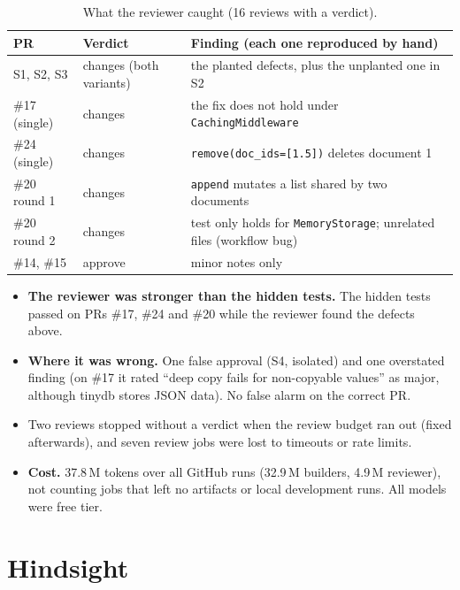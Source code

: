 \documentclass[11pt,a4paper]{article}
\newcommand{\code}[1]{\texttt{#1}}
\begin{document}
\begin{table}[H]
\centering\small
\begin{tabularx}{\linewidth}{@{}l l Y@{}}
\toprule
\textbf{PR} & \textbf{Verdict} & \textbf{Finding (each one reproduced by hand)} \\
\midrule
S1, S2, S3 & changes (both variants) & the planted defects, plus the unplanted one in S2 \\
\#17 (single) & changes & the fix does not hold under \code{CachingMiddleware} \\
\#24 (single) & changes & \code{remove(doc\_ids=[1.5])} deletes document 1 \\
\#20 round 1 & changes & \code{append} mutates a list shared by two documents \\
\#20 round 2 & changes & test only holds for \code{MemoryStorage}; unrelated files (workflow bug) \\
\#14, \#15 & approve & minor notes only \\
\bottomrule
\end{tabularx}
\caption{What the reviewer caught (16 reviews with a verdict).}
\end{table}

\begin{itemize}
  \item \textbf{The reviewer was stronger than the hidden tests.} The hidden tests passed on PRs \#17, \#24
        and \#20 while the reviewer found the defects above.
  \item \textbf{Where it was wrong.} One false approval (S4, isolated) and one overstated finding (on \#17
        it rated ``deep copy fails for non-copyable values'' as major, although tinydb stores JSON data). No
        false alarm on the correct PR.
  \item Two reviews stopped without a verdict when the review budget ran out (fixed afterwards), and seven
        review jobs were lost to timeouts or rate limits.
  \item \textbf{Cost.} 37.8\,M tokens over all GitHub runs (32.9\,M builders, 4.9\,M reviewer), not counting
        jobs that left no artifacts or local development runs. All models were free tier.
\end{itemize}

\section{Hindsight}\label{sec:hindsight}
\end{document}
